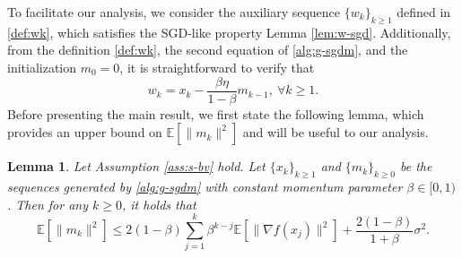 \documentclass[10pt]{article}
\numberwithin{equation}{section}
\newtheorem{lemma}{Lemma}
\theoremstyle{definition}
\newcommand{\ebb}{\mathbb{E}}  %
\begin{document}
To facilitate our analysis, we consider the auxiliary sequence $\{w_k\}_{k\ge1}$ defined in \eqref{def:wk}, which satisfies the SGD-like property Lemma \ref{lem:w-sgd}. Additionally, from the definition \eqref{def:wk}, the second equation of \eqref{alg:g-sgdm}, and the initialization $m_0=0$, it is straightforward to verify that
\begin{equation}\label{eq:wk-xk}
    w_k=x_k-\frac{\beta\eta}{1-\beta} m_{k-1},~\forall k\ge 1.
\end{equation}
Before presenting the main result, we first state the following lemma, which provides an upper bound on $\ebb[\|m_k\|^2]$ and will be useful to our analysis.
\begin{lemma}\label{lem:m-var}
Let Assumption \ref{ass:s-bv} hold. Let $\{x_k\}_{k\ge 1}$ and $\{m_k\}_{k\ge 0}$ be the sequences generated by \eqref{alg:g-sgdm} with constant momentum parameter $\beta\in [0,1)$. Then for any $k\ge 0$, it holds that
\[
\ebb[\|m_k\|^2] \leq 2(1-\beta) \sum_{j=1}^k \beta^{k-j}\ebb[\|\nabla f(x_j)\|^2]+\frac{2(1-\beta)}{1+\beta} \sigma^2.
\]
\end{lemma}
\end{document}
